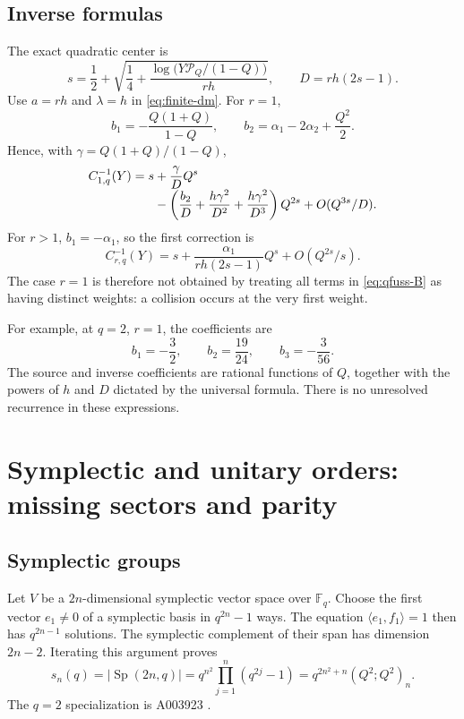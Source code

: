 \documentclass[11pt]{article}
\numberwithin{equation}{section}
\theoremstyle{definition}
\newcommand{\F}{\mathbb F}
\newcommand{\Sp}{\operatorname{Sp}}
\newcommand{\Pinf}{\mathcal P_Q}
\begin{document}
\subsection{Inverse formulas}

The exact quadratic center is
\begin{equation}\label{eq:qfuss-center}
 s=\frac12+\sqrt{\frac14+
       \frac{\log\bigl(Y\Pinf/(1-Q)\bigr)}{rh}},
 \qquad D=rh(2s-1).
\end{equation}
Use $a=rh$ and $\lambda=h$ in \eqref{eq:finite-dm}. For $r=1$,
\begin{equation}\label{eq:qCatalan-b12}
 b_1=-\frac{Q(1+Q)}{1-Q},\qquad
 b_2=\alpha_1-2\alpha_2+\frac{Q^2}{2}.
\end{equation}
Hence, with $\gamma=Q(1+Q)/(1-Q)$,
\begin{align}\label{eq:qCatalan-inverse}
 C_{1,q}^{-1}(Y)=s
 &+\frac{\gamma}{D}Q^s\\[-0.3em]
 &-\left(\frac{b_2}{D}
       +\frac{h\gamma^2}{D^2}
       +\frac{h\gamma^2}{D^3}\right)Q^{2s}
 +O(Q^{3s}/D).\notag
\end{align}
For $r>1$, $b_1=-\alpha_1$, so the first correction is
\begin{equation}\label{eq:qFuss-first}
 C_{r,q}^{-1}(Y)=s+\frac{\alpha_1}{rh(2s-1)}Q^s
                  +O(Q^{2s}/s).
\end{equation}
The case $r=1$ is therefore not obtained by treating all terms in \eqref{eq:qfuss-B} as having distinct weights: a collision occurs at the very first weight.

For example, at $q=2$, $r=1$, the coefficients are
\[
 b_1=-\frac32,\qquad b_2=\frac{19}{24},\qquad
 b_3=-\frac{3}{56}.
\]
The source and inverse coefficients are rational functions of $Q$, together with the powers of $h$ and $D$ dictated by the universal formula. There is no unresolved recurrence in these expressions.

\section{Symplectic and unitary orders: missing sectors and parity}
\label{sec:classical}

\subsection{Symplectic groups}

Let $V$ be a $2n$-dimensional symplectic vector space over $\F_q$. Choose the first vector $e_1\ne0$ of a symplectic basis in $q^{2n}-1$ ways. The equation $\langle e_1,f_1\rangle=1$ then has $q^{2n-1}$ solutions. The symplectic complement of their span has dimension $2n-2$. Iterating this argument proves
\begin{equation}\label{eq:Sp-count}
 s_n(q)=|\Sp(2n,q)|
 =q^{n^2}\prod_{j=1}^n(q^{2j}-1)
 =q^{2n^2+n}(Q^2;Q^2)_n.
\end{equation}
The $q=2$ specialization is A003923 \cite{oeisSp}.
\end{document}
